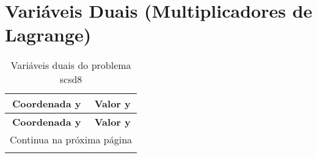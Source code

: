 \documentclass[12pt]{article}
\begin{document}
\begin{longtable}{@{}cccc@{}}
\end{longtable}

\section{Variáveis Duais (Multiplicadores de Lagrange)}

\begin{longtable}{@{}cc@{}}
\caption{Variáveis duais do problema scsd8} \\
\toprule
\textbf{Coordenada y} & \textbf{Valor y} \\
\midrule
\endfirsthead

\toprule
\textbf{Coordenada y} & \textbf{Valor y} \\
\midrule
\endhead

\midrule \multicolumn{2}{r}{{Continua na próxima página}} \\ \midrule
\endfoot


\end{longtable}
\end{document}
